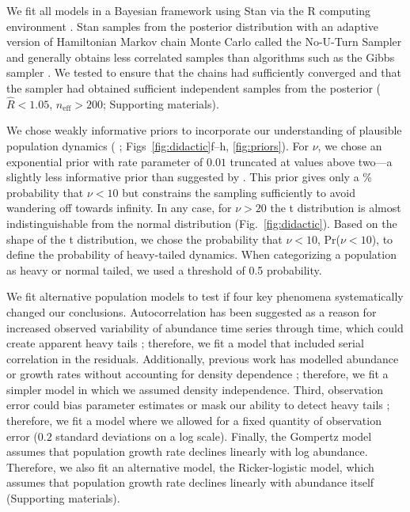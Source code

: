 We fit all models in a Bayesian framework using Stan \citep{stan-manual2014}
via the R computing environment \citep{r2014}. Stan samples from the posterior
distribution with an adaptive version of Hamiltonian Markov chain Monte Carlo
called the No-U-Turn Sampler and generally obtains less correlated samples
than algorithms such as the Gibbs sampler \citep{hoffman2014}. We tested to
ensure that the chains had sufficiently converged and that the sampler had
obtained sufficient independent samples from the posterior ($\widehat{R} <
1.05$, $n_\mathrm{eff} > 200$; Supporting materials).

We chose weakly informative priors to incorporate our understanding of
plausible population dynamics (\citeauthor{gelman2014} \citeyear{gelman2014};
Figs~\ref{fig:didactic}f--h, \ref{fig:priors}). For $\nu$, we chose an
exponential prior with rate parameter of $0.01$ truncated at values above
two---a slightly less informative prior than suggested by
\citet{fernandez1998}. This prior gives only a \basePriorProbHeavy \%
probability that $\nu < 10$ but constrains the sampling sufficiently to avoid
wandering off towards infinity. In any case, for $\nu > 20$ the t distribution
is almost indistinguishable from the normal distribution
(Fig.~\ref{fig:didactic}). Based on the shape of the t distribution, we chose
the probability that $\nu < 10$, Pr($\nu < 10$), to define the probability of
heavy-tailed dynamics. When categorizing a population as heavy or normal tailed,
we used a threshold of 0.5 probability.

We fit alternative population models to test if four key phenomena
systematically changed our conclusions. Autocorrelation has been suggested as
a reason for increased observed variability of abundance time series through
time, which could create apparent heavy tails \citep{inchausti2002};
therefore, we fit a model that included serial correlation in the residuals.
Additionally, previous work has modelled abundance or growth rates without
accounting for density dependence \citep{halley2002,segura2013}; therefore, we
fit a simpler model in which we assumed density independence. Third,
observation error could bias parameter estimates \citep{knape2012} or mask our
ability to detect heavy tails \citep{ward2007}; therefore, we fit a model
where we allowed for a fixed quantity of observation error ($0.2$ standard
deviations on a log scale). Finally, the Gompertz model assumes that
population growth rate declines linearly with log abundance. Therefore, we
also fit an alternative model, the Ricker-logistic model, which assumes that
population growth rate declines linearly with abundance itself (Supporting
materials).

